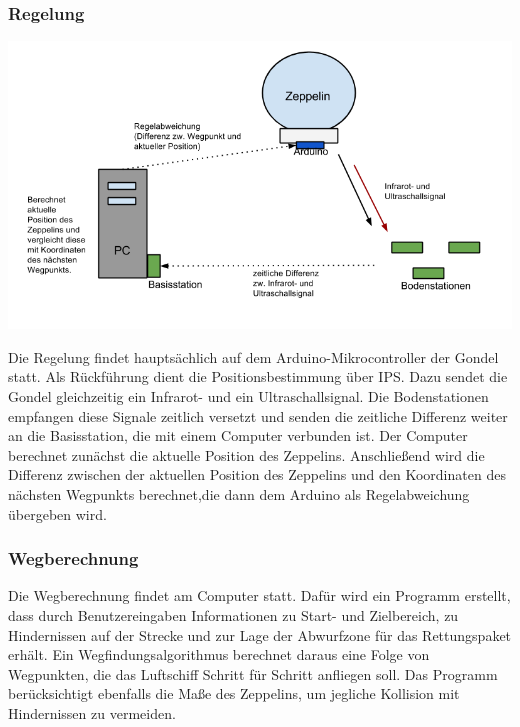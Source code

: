 \documentclass[lang=ngerman,inputenc=utf8,fontsize=10pt]{ldvarticle}
\begin{document}
\newpage 

\subsubsection*{Regelung}
\begin{center}
\includegraphics[width=\textwidth]{Regelung.png}
\end{center}
Die Regelung findet hauptsächlich auf dem Arduino-Mikrocontroller der Gondel statt. Als Rückführung dient die Positionsbestimmung über IPS. Dazu sendet die Gondel gleichzeitig ein Infrarot- und ein Ultraschallsignal. Die Bodenstationen empfangen diese Signale zeitlich versetzt und senden die zeitliche Differenz weiter an die Basisstation, die mit einem Computer verbunden ist. Der Computer berechnet zunächst die aktuelle Position des Zeppelins. Anschließend wird die Differenz zwischen der aktuellen Position des Zeppelins und den Koordinaten des nächsten Wegpunkts berechnet,die dann dem Arduino als Regelabweichung übergeben wird.

\subsubsection*{Wegberechnung}
Die Wegberechnung findet am Computer statt. Dafür wird ein Programm erstellt, dass durch Benutzereingaben Informationen zu Start- und Zielbereich, zu Hindernissen auf der Strecke und zur Lage der Abwurfzone für das Rettungspaket erhält. Ein Wegfindungsalgorithmus berechnet daraus eine Folge von Wegpunkten, die das Luftschiff Schritt für Schritt anfliegen soll. Das Programm berücksichtigt ebenfalls die Maße des Zeppelins, um jegliche Kollision mit Hindernissen zu vermeiden.
\newpage 
\end{document}
